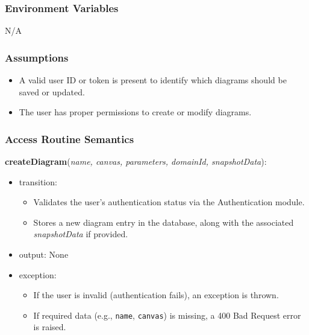 \documentclass[12pt, titlepage]{article}
\begin{document}
\subsubsection{Environment Variables}

N/A

\subsubsection{Assumptions}

\begin{itemize}
  \item A valid user ID or token is present to identify which diagrams should be saved or updated.
  \item The user has proper permissions to create or modify diagrams.
\end{itemize}

\subsubsection{Access Routine Semantics}

\noindent \textbf{createDiagram}(\textit{name, canvas, parameters, domainId, snapshotData}):
\begin{itemize}
\item transition: 
  \begin{itemize}
    \item Validates the user's authentication status via the Authentication module.
    \item Stores a new diagram entry in the database, along with the associated \textit{snapshotData} if provided. 
  \end{itemize}
\item output: None
\item exception: 
  \begin{itemize}
    \item If the user is invalid (authentication fails), an exception is thrown.
    \item If required data (e.g., \texttt{name}, \texttt{canvas}) is missing, a 400 Bad Request error is raised.
  \end{itemize}
\end{itemize}
\end{document}
